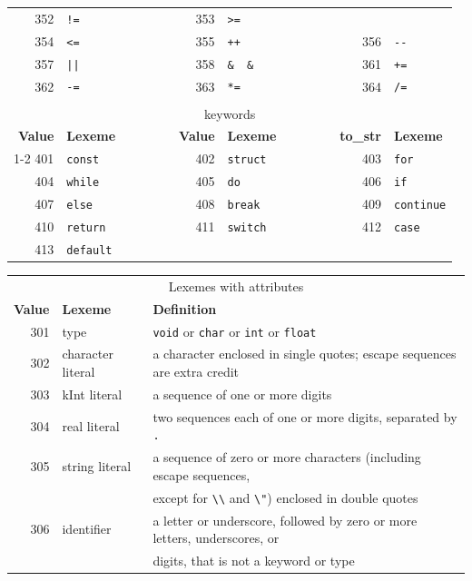 \documentclass{report}
\newcommand{\+}{}
\begin{document}
\begin{table}[t]
\begin{tabular}{rlcrlcrl}
            352 & \verb|!=| & &
            353 & \verb|>=| \\
            354 & \verb|<=| & &
            355 & \verb|++| & &
            356 & \verb|--| \\
            357 & \verb+||+ & &
            358 & \verb|&  &  | & &
            361 & \verb|+=| \\
            362 & \verb|-=| & &
            363 & \verb|*=| & &
            364 & \verb|/=| \\
            \\
            \multicolumn{8}{c}{keywords}
            \\[1mm]
            {\bf Value} & {\bf Lexeme}
            & ~~~~~~ &
                {\bf Value} & {\bf Lexeme}
            & ~~~~~~ &
                {\bf to\_str} & {\bf Lexeme}
            \\ \cline{1-2} \cline{4-5} \cline{7-8}
            401 & \verb|const| & &
            402 & \verb|struct| & &
            403 & \verb|for| \\
            404 & \verb|while| & &
            405 & \verb|do| & &
            406 & \verb|if| \\
            407 & \verb|else| & &
            408 & \verb|break| & &
            409 & \verb|continue| \\
            410 & \verb|return| & &
            411 & \verb|switch| & &
            412 & \verb|case| \\
            413 & \verb|default| \\
        \end{tabular}

        \begin{tabular}{rll}
            \\
            \multicolumn{3}{c}{Lexemes with attributes}
            \\[1mm]
            {\bf Value} & {\bf Lexeme} & {\bf Definition}
            \\ \hline
            301 & type & \verb|void| or \verb|char| or \verb|int| or \verb|float|
            \\
            302 & character literal & a character enclosed in single quotes;
            escape sequences are extra credit
            \\
            303 & kInt literal & a sequence of one or more digits
            \\
            304 & real literal & two sequences each of one or more digits, separated by \verb|.|
            \\
            305 & string literal & a sequence of zero or more characters (including escape sequences,
            \\ & & except for \verb|\\| and \verb|\"|) enclosed in double quotes
            \\
            306 & identifier & a letter or underscore, followed by zero or more letters,
            underscores, or
            \\ & & digits, that is not a keyword or type
        \end{tabular}


\end{table}
\end{document}
